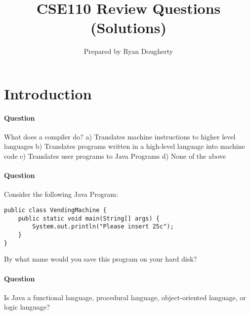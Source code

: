 \documentclass{article}
\title{CSE110 Review Questions (Solutions)}
\author{Prepared by Ryan Dougherty}
\date{}
\begin{document}
\maketitle

\section{Introduction}

\setcounter{question_num}{1}
\paragraph{Question }
What does a compiler do?
\newline a) Translates machine instructions to higher level languages
\newline b) Translates programs written in a high-level language into machine code
\newline c) Translates user programs to Java Programs
\newline d) None of the above

\addtocounter{question_num}{1}
\paragraph{Question }
Consider the following Java Program:
\begin{lstlisting}
public class VendingMachine {
	public static void main(String[] args) {
		System.out.println("Please insert 25c");
	}
}
\end{lstlisting}
By what name would you save this program on your hard disk?

\addtocounter{question_num}{1}
\paragraph{Question }
Is Java a functional language, procedural language, object-oriented language, or logic language?
\end{document}
